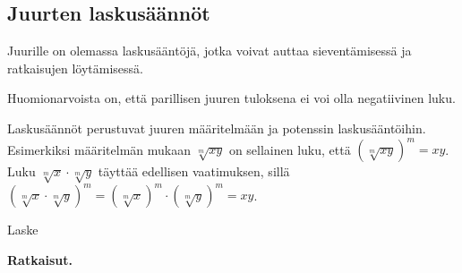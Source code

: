 \subsection*{Juurten laskusäännöt}
Juurille on olemassa laskusääntöjä, jotka voivat auttaa sieventämisessä ja ratkaisujen löytämisessä. 



Huomionarvoista on, että parillisen juuren tuloksena ei voi olla negatiivinen luku.

Laskusäännöt perustuvat juuren määritelmään ja potenssin laskusääntöihin. Esimerkiksi
määritelmän mukaan $\sqrt[m]{xy}$ on sellainen luku, että $\left( \sqrt[m]{xy} \right)^m = xy$.
Luku $\sqrt[m]{x} \cdot \sqrt[m]{y}$ täyttää edellisen vaatimuksen, sillä
$\left( \sqrt[m]{x} \cdot \sqrt[m]{y} \right)^m = \left( \sqrt[m]{x} \right)^m \cdot \left( \sqrt[m]{y} \right)^m = xy$.



\begin{esimerkki}
Laske
\begin{alakohdat}
\end{alakohdat}

{\bf Ratkaisut.}
\begin{alakohdat}
\end{alakohdat}

\end{esimerkki}



